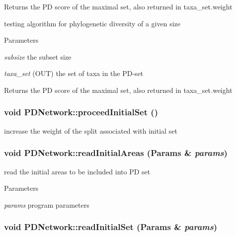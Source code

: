 \begin{DoxyReturn}{Returns}
the PD score of the maximal set, also returned in taxa\_\-set.weight
\end{DoxyReturn}
testing algorithm for phylogenetic diversity of a given size 
\begin{DoxyParams}{Parameters}
\item[{\em subsize}]the subset size \item[{\em taxa\_\-set}](OUT) the set of taxa in the PD-\/set \end{DoxyParams}
\begin{DoxyReturn}{Returns}
the PD score of the maximal set, also returned in taxa\_\-set.weight 
\end{DoxyReturn}
\hypertarget{classPDNetwork_a8612c1f67250fad10a5585ec727019ab}{
\subsubsection[{proceedInitialSet}]{\setlength{\rightskip}{0pt plus 5cm}void PDNetwork::proceedInitialSet ()}}
\label{classPDNetwork_a8612c1f67250fad10a5585ec727019ab}
increase the weight of the split associated with initial set \hypertarget{classPDNetwork_ad63b20eaa9bc56a456350d590f1c574e}{
\subsubsection[{readInitialAreas}]{\setlength{\rightskip}{0pt plus 5cm}void PDNetwork::readInitialAreas ({\bf Params} \& {\em params})}}
\label{classPDNetwork_ad63b20eaa9bc56a456350d590f1c574e}
read the initial areas to be included into PD set 
\begin{DoxyParams}{Parameters}
\item[{\em params}]program parameters \end{DoxyParams}
\hypertarget{classPDNetwork_ad228e5aa31704ab00b4689bcde67551c}{
\subsubsection[{readInitialSet}]{\setlength{\rightskip}{0pt plus 5cm}void PDNetwork::readInitialSet ({\bf Params} \& {\em params})}}
